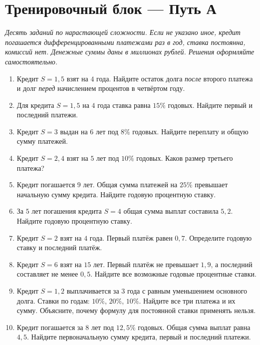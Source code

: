 \documentclass[a4paper,12pt]{article}
\begin{document}
\section*{Тренировочный блок --- Путь А}
\textit{Десять заданий по нарастающей сложности. Если не указано иное, кредит погашается дифференцированными платежами раз в год, ставка постоянна, комиссий нет. Денежные суммы даны в миллионах рублей. Решения оформляйте самостоятельно.}
\begin{enumerate}
\item Кредит $S=1{,}5$ взят на $4$ года. Найдите остаток долга \emph{после} второго платежа и долг \emph{перед} начислением процентов в четвёртом году.
\item Для кредита $S=1{,}5$ на $4$ года ставка равна $15\%$ годовых. Найдите первый и последний платежи.
\item Кредит $S=3$ выдан на $6$ лет под $8\%$ годовых. Найдите переплату и общую сумму платежей.
\item Кредит $S=2{,}4$ взят на $5$ лет под $10\%$ годовых. Каков размер третьего платежа?
\item Кредит погашается $9$ лет. Общая сумма платежей на $25\%$ превышает начальную сумму кредита. Найдите годовую процентную ставку.
\item За $5$ лет погашения кредита $S=4$ общая сумма выплат составила $5{,}2$. Найдите годовую процентную ставку.
\item Кредит $S=2$ взят на $4$ года. Первый платёж равен $0{,}7$. Определите годовую ставку и последний платёж.
\item Кредит $S=6$ взят на $15$ лет. Первый платёж не превышает $1{,}9$, а последний составляет не менее $0{,}5$. Найдите все возможные годовые процентные ставки.
\item Кредит $S=1{,}2$ выплачивается за $3$ года с равным уменьшением основного долга. Ставки по годам: $10\%$, $20\%$, $10\%$. Найдите все три платежа и их сумму. Объясните, почему формулу для постоянной ставки применять нельзя.
\item Кредит погашается за $8$ лет под $12{,}5\%$ годовых. Общая сумма выплат равна $4{,}5$. Найдите первоначальную сумму кредита, первый и последний платежи.
\end{enumerate}

\clearpage
\end{document}
